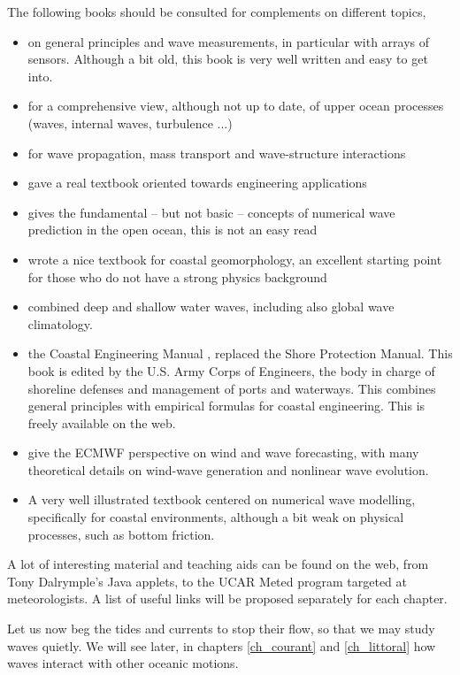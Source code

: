 The following books should be consulted for complements on different topics, 
\begin{itemize}
\item \cite{Kinsman1965} on general principles and wave measurements, in particular with arrays of sensors. Although a bit 
old, this book is very well written and easy to get into. 
\item \cite{Phillips1977} for a comprehensive view, although not up to date, of upper ocean processes (waves, internal waves, turbulence ...) 
\item \cite{Mei1989} for wave propagation, mass transport and wave-structure interactions
\item \cite{Dean&Dalrymple1991} gave a real textbook oriented towards engineering applications
\item \cite{WAMBook} gives the fundamental -- but not basic -- concepts of numerical wave prediction 
in the open ocean, this is not an easy read
\item \cite{Komar1998} wrote a nice textbook for coastal geomorphology, an excellent starting point for those 
who do not have a strong physics background
\item \cite{Young1999}  combined deep and shallow water waves, including also global wave climatology. 
\item the Coastal Engineering Manual \citep{USACE2002}, replaced the Shore Protection Manual. This book 
is edited by the U.S. Army Corps of Engineers, the body in charge of shoreline defenses and management of 
ports and waterways. This combines general principles with empirical formulas for coastal engineering. This is 
freely available on the web. 
\item \cite{Janssen2004} give the ECMWF perspective on wind and wave forecasting, with many theoretical details on wind-wave 
generation and nonlinear wave evolution. 
\item \cite{Holthuijsen2007} A very well illustrated textbook centered on numerical wave modelling, specifically for coastal 
environments, although a bit weak on physical processes, such as bottom friction.  
\end{itemize}
A lot of interesting material and teaching aids can be found on the web, from Tony Dalrymple's Java applets, to the UCAR Meted program 
targeted at meteorologists. A list of useful links will be proposed separately for each chapter. 

Let us now beg the tides and currents to stop their flow, so that we may study waves quietly. We will see later, in chapters \ref{ch_courant} and 
\ref{ch_littoral} how waves interact with other oceanic motions. 

